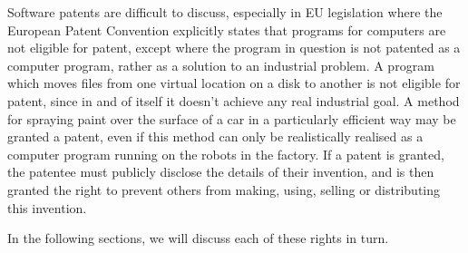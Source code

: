 Software patents are difficult to discuss, especially in EU legislation where the European Patent Convention explicitly states%
 that programs for computers are not eligible for patent, except where the program in question is not patented as a computer program, rather as a solution to an industrial problem. A program which moves files from one virtual location on a disk to another is not eligible for patent, since in and of itself it doesn't achieve any real industrial goal. A method for spraying paint over the surface of a car in a particularly efficient way may be granted a patent, even if this method can only be realistically realised as a computer program running on the robots in the factory. If a patent is granted, the patentee must publicly disclose the details of their invention, and is then granted the right to prevent others from making, using, selling or distributing this invention.

In the following sections, we will discuss each of these rights in turn.
